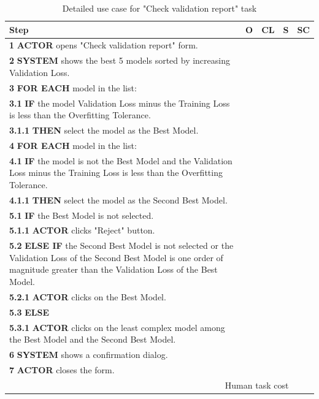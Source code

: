 \begin{table}[H]
\centering
\begin{tabularx}{\textwidth}{|X|c|c|c|c|}
\hline
\textbf{Step} & \textbf{O} & \textbf{CL} & \textbf{S} & \textbf{SC} \\
\hline
\textbf{1} \textbf{ACTOR} opens "Check validation report" form. & & & & \\
\hline
\textbf{2} \textbf{SYSTEM} shows the best 5 models sorted by increasing Validation Loss. & & & & \\
\hline
\textbf{3} \textbf{FOR EACH} model in the list: & & & & \\
\hline
\textbf{3.1} \textbf{IF} the model Validation Loss minus the Training Loss is less than the Overfitting Tolerance. & & & & \\
\hline
\textbf{3.1.1} \textbf{THEN} select the model as the Best Model. & & & & \\
\hline
\textbf{4} \textbf{FOR EACH} model in the list: & & & & \\
\hline
\textbf{4.1} \textbf{IF} the model is not the Best Model and the Validation Loss minus the Training Loss is less than the Overfitting Tolerance. & & & & \\
\hline
\textbf{4.1.1} \textbf{THEN} select the model as the Second Best Model. & & & & \\
\hline
\textbf{5.1} \textbf{IF} the Best Model is not selected. & & & & \\
\hline
\textbf{5.1.1} \textbf{ACTOR} clicks "Reject" button. & & & & \\
\hline
\textbf{5.2} \textbf{ELSE IF} the Second Best Model is not selected or the Validation Loss of the Second Best Model is one order of magnitude greater than the Validation Loss of the Best Model. & & & & \\
\hline
\textbf{5.2.1} \textbf{ACTOR} clicks on the Best Model. & & & & \\
\hline
\textbf{5.3} \textbf{ELSE} & & & & \\
\hline
\textbf{5.3.1} \textbf{ACTOR} clicks on the least complex model among the Best Model and the Second Best Model. & & & & \\
\hline
\textbf{6} \textbf{SYSTEM} shows a confirmation dialog. & & & & \\
\hline
\textbf{7} \textbf{ACTOR} closes the form. & & & & \\
\hline
\multicolumn{4}{|r|}{Human task cost} & \\
\hline
\end{tabularx}
\caption{Detailed use case for "Check validation report" task}
\label{table:check_validation_report}
\end{table}

